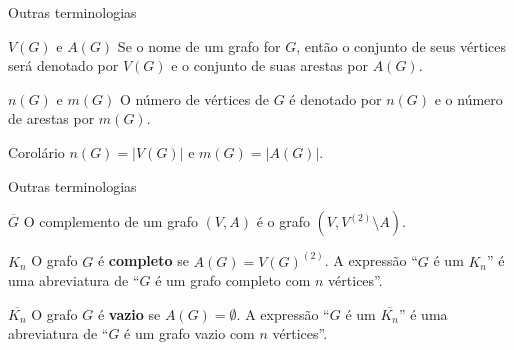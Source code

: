 \documentclass[xcolor=dvipsnames,table]{beamer}
\begin{document}
	\begin{frame}{Outras terminologias}
		\begin{block}{$V(G)$ e $A(G)$}
			Se o nome de um grafo for $G$, então o conjunto de seus vértices será denotado por $V(G)$ e o conjunto de suas arestas por $A(G)$.
		\end{block}
		\pause
		\begin{block}{$n(G)$ e $m(G)$}
			O número de vértices de $G$ é denotado por $n(G)$ e o número de arestas por $m(G)$. 
		\end{block}
		\pause
		\begin{block}{Corolário}
			$n(G) = |V(G)|$ e $m(G) = |A(G)|$.
		\end{block}
	\end{frame}
	
	\begin{frame}{Outras terminologias}
		\begin{block}{$\overline{G}$}
			O complemento de um grafo $(V, A)$ é o grafo $(V, V^{(2)} \setminus A)$.
		\end{block}
		\pause
		\begin{block}{$K_n$} 
			O grafo $G$ é {\bf completo} se $A(G) = V(G)^{(2)}$. A expressão ``$G$ é um $K_n$'' é uma abreviatura de ``$G$ é um grafo completo com $n$ vértices''.
		\end{block}
		\pause
		\begin{block}{$\overline{K_n}$} 
			O grafo $G$ é {\bf vazio} se $A(G) =\emptyset$. A expressão ``$G$ é um $\overline{K_n}$'' é uma abreviatura de ``$G$ é um grafo vazio com $n$ vértices''.
		\end{block}
	\end{frame}
	
	\begin{frame}
		\titlepage
	\end{frame}
	
\end{document}
